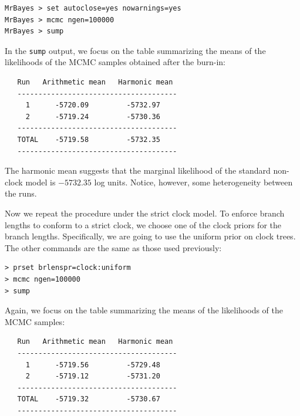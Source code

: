 \documentclass[12pt]{book}
\newcommand{\ttt}[1]{\texttt{#1}}
\begin{document}
\begin{singlespacing}
\small
\begin{verbatim}
MrBayes > set autoclose=yes nowarnings=yes
MrBayes > mcmc ngen=100000
MrBayes > sump
\end{verbatim}
\end{singlespacing}
\normalsize

In the \ttt{sump} output, we focus on the table summarizing the means of the likelihoods of the
MCMC samples obtained after the burn-in:

\begin{singlespacing}
\footnotesize
\begin{verbatim}
   Run   Arithmetic mean   Harmonic mean
   --------------------------------------
     1      -5720.09         -5732.97
     2      -5719.24         -5730.36
   --------------------------------------
   TOTAL    -5719.58         -5732.35
   --------------------------------------
\end{verbatim}
\end{singlespacing}
\normalsize

The harmonic mean suggests that the marginal likelihood of the standard non-clock model is
$-5732.35$ log units. Notice, however, some heterogeneity between the runs.

Now we repeat the procedure under the strict clock model. To enforce branch lengths to conform to a
strict clock, we choose one of the clock priors for the branch lengths. Specifically, we are going
to use the uniform prior on clock trees. The other commands are the same as those used previously:

\begin{singlespacing}
\small
\begin{verbatim}
> prset brlenspr=clock:uniform
> mcmc ngen=100000
> sump
\end{verbatim}
\end{singlespacing}
\normalsize

Again, we focus on the table summarizing the means of the likelihoods of the MCMC samples:

\begin{singlespacing}
\footnotesize
\begin{verbatim}
   Run   Arithmetic mean   Harmonic mean
   --------------------------------------
     1      -5719.56         -5729.48
     2      -5719.12         -5731.20
   --------------------------------------
   TOTAL    -5719.32         -5730.67
   --------------------------------------
\end{verbatim}
\end{singlespacing}
\normalsize
\end{document}
